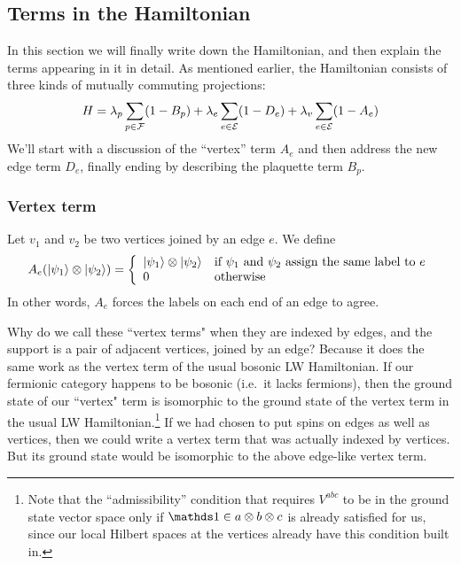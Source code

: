 \subsection{Terms in the Hamiltonian} \label{terms_in_Hamiltonian}

In this section we will finally write down the Hamiltonian, and then explain the terms appearing in it in detail. 
As mentioned earlier, the Hamiltonian consists of three kinds of mutually commuting projections:
\begin{align} \label{terms_in_ham}
H = \lambda_p \sum_{p \in \mathcal{F}} (1-B_p)  + \lambda_e \sum_{e \in \mathcal{E}} (1-D_e) + \lambda_v \sum_{e\in \mathcal{E}} (1-A_e)
\end{align}
We'll start with a discussion of the ``vertex'' term $A_e$ and then address the new edge term $D_e$, 
finally ending by describing the plaquette term $B_p$.




\subsubsection{Vertex term}   \label{VertexHamiltonian}

Let $v_1$ and $v_2$ be two vertices joined by an edge $e$.
We define
\begin{align}
A_e(\left|\psi_1\right\rangle \otimes \left|\psi_2\right\rangle) = 
\left\{
                \begin{array}{ll}
                   \left|\psi_1\right\rangle \otimes \left|\psi_2\right\rangle & \text{if $\psi_1$ and $\psi_2$ assign the same label to $e$} \\
                  0 & \text{otherwise}
                \end{array}
              \right.
\end{align}
In other words, $A_e$ forces the labels on each end of an edge to agree.

Why do we call these ``vertex terms" when they are indexed by edges, and the support is a pair of adjacent vertices, joined by an edge?
Because it does the same work as the vertex term of the usual bosonic LW Hamiltonian.
If our fermionic category happens to be bosonic (i.e.\ it lacks fermions), then the ground state of our ``vertex" term is isomorphic to the ground state
of the vertex term in the usual LW Hamiltonian.\footnote{Note that the ``admissibility'' condition that requires $V^{abc}$ to be in the ground state vector space only if $\unit\in a\tp b \tp c$ is already satisfied for us, since our local Hilbert spaces at the vertices already have this condition built in.}
If we had chosen to put spins on edges as well as vertices, then we could write a vertex term that was actually indexed by vertices.
But its ground state would be isomorphic to the above edge-like vertex term.

